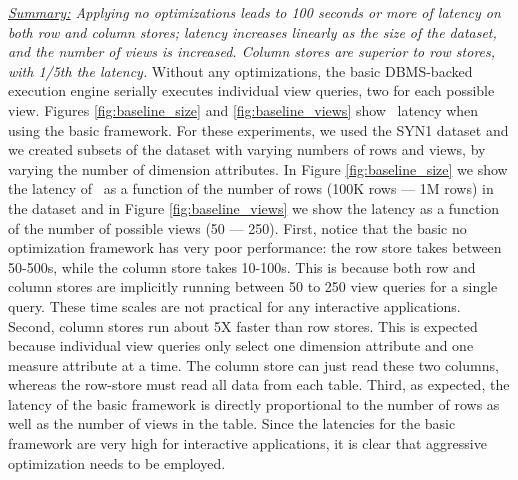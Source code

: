 {\em \underline{Summary:} Applying no optimizations 
leads to 100 seconds or more of latency on both row and column stores;
latency increases linearly as the size of the dataset, and the number
of views is increased. Column stores are superior to row stores,
with 1/5th the latency.}
Without any optimizations, the basic DBMS-backed execution engine
serially executes individual view queries, two for each possible view.
Figures \ref{fig:baseline_size} and \ref{fig:baseline_views} show
\SeeDB\ latency when using the basic framework.
For these experiments, we used the SYN1 dataset and we created subsets of the dataset with
varying numbers of rows and views, by varying the number of dimension attributes. 
In Figure \ref{fig:baseline_size} we show the latency of \SeeDB\ as a function
of the number of rows (100K rows --- 1M rows) in the dataset and in 
Figure \ref{fig:baseline_views} we show the latency as a function 
of the number of possible views (50 --- 250).
First, notice that the basic no optimization framework has very 
poor performance: the row store takes between 50-500s, 
while the column store takes 10-100s. 
This is because both row and column stores are implicitly
running between 50 to 250 view queries for a single \SeeDB query.
These time scales are not practical for
any interactive applications. 
Second, column stores run about 5X faster than row stores. 
This is expected because individual view queries only select one dimension
attribute and one measure attribute at a time.  
The column store can just read these two
columns, whereas the row-store must read all data from each table.
Third, as expected, the latency of the
basic framework is directly proportional to the number of rows as well as the 
number of views in the table.
Since the latencies for the basic framework are very high for interactive
applications, it is clear that aggressive optimization needs to be employed. 


